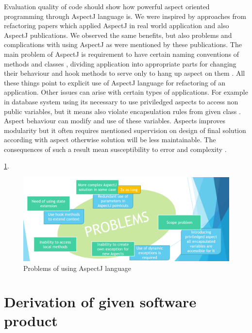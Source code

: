 \documentclass[11pt,slovak,a4paper,twoside]{article}
\begin{document}
Evaluation quality of code should show how powerful aspect oriented programming through AspectJ language is. We were inspired by approaches from refactoring papers which applied AspectJ in real world application and also AspectJ publications. We observed the same benefits, but also problems and complications with using AspectJ as were mentioned by these publications. The main problem of AspectJ is requirement to have certain naming conventions of methods and classes \cite{laddad_aspectj_2003}, dividing application into appropriate parts for changing their behaviour and hook methods to serve only to hang up aspect on them \cite{kastner_case_2007}. All these things point to explicit use of AspectJ language for refactoring of an application. Other issues can arise with certain types  of applications. For example in database system using its necessary to use priviledged aspects to access non public variables, but it means also violate encapsulation rules from given class \cite{kastner_case_2007}. Aspect behaviour can modify and use of these variables. Aspects improves modularity but it often requires mentioned supervision on design of final solution according with aspect otherwise solution will be less maintainable. The consequences of such a result mean susceptibility to error and complexity \cite{EAOR_yokomori_2011}. 
 
  \ref{problemsOfAspectJ}.

\begin{figure}[H]  %
					\begin{center}
									\includegraphics[width=\linewidth]{fig/problemsOfAspectJEN.png}
									\caption{Problems of using AspectJ language}
									\label{problemsOfAspectJ}
					\end{center}
\end{figure}



\section{Derivation of given software product} \label{gameDerivation}
\end{document}
